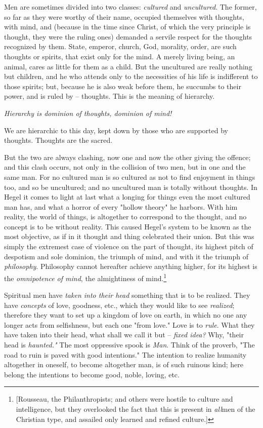 Men are sometimes divided into two classes: \textit{cultured} and 
\textit{uncultured}. The former, so far as they were worthy of their name, 
occupied themselves with thoughts, with mind, and (because in the time since 
Christ, of which the very principle is thought, they were the ruling ones) 
demanded a servile respect for the thoughts recognized by them. State, 
emperor, church, God, morality, order, are such thoughts or spirits, that 
exist only for the mind. A merely living being, an animal, cares as little for 
them as a child. But the uncultured are really nothing but children, and he 
who attends only to the necessities of his life is indifferent to those 
spirits; but, because he is also weak before them, he succumbs to their power, 
and is ruled by -- thoughts. This is the meaning of hierarchy.

\textit{Hierarchy is dominion of thoughts, dominion of mind!}

We are hierarchic to this day, kept down by those who are supported by 
thoughts. Thoughts are the sacred.

But the two are always clashing, now one and now the other giving the offence; 
and this clash occurs, not only in the collision of two men, but in one and 
the same man. For no cultured man is so cultured as not to find enjoyment in 
things too, and so be uncultured; and no uncultured man is totally without 
thoughts. In Hegel it comes to light at last what a longing for things even 
the most cultured man has, and what a horror of every "{}hollow theory"{} he 
harbors. With him reality, the world of things, is altogether to correspond to 
the thought, and no concept is to be without reality. This caused Hegel's 
system to be known as the most objective, as if in it thought and thing 
celebrated their union. But this was simply the extremest case of violence on 
the part of thought, its highest pitch of despotism and sole dominion, the 
triumph of mind, and with it the triumph of \textit{philosophy}. Philosophy 
cannot hereafter achieve anything higher, for its highest is the 
\textit{omnipotence of mind}, the almightiness of mind.\footnote{[Rousseau, 
the Philanthropists; and others were hostile to culture and intelligence, but 
they overlooked the fact that this is present in \textit{all}men of the 
Christian type, and assailed only learned and refined culture.]}

Spiritual men have \textit{taken into their head} something that is to be 
realized. They have \textit{concepts} of love, goodness, etc., which they 
would like to see \textit{realized}; therefore they want to set up a kingdom 
of love on earth, in which no one any longer acts from selfishness, but each 
one "{}from love."{} Love is to \textit{rule}. What they have taken into their 
head, what shall we call it but -- \textit{fixed idea?} Why, "{}their head is 
\textit{haunted."{}} The most oppressive spook is \textit{Man}. Think of the 
proverb, "{}The road to ruin is paved with good intentions."{} The intention 
to realize humanity altogether in oneself, to become altogether man, is of 
such ruinous kind; here belong the intentions to become good, noble, loving, 
etc.

